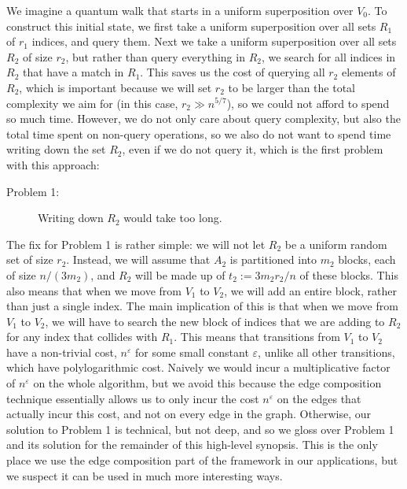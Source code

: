 \documentclass{article}
\renewcommand{\>}{\rangle}
\newcommand{\<}{\langle}
\renewcommand{\(}{\left(}
\renewcommand{\)}{\right)}
\newcommand{\eps}{\varepsilon}
\begin{document}
We imagine a quantum walk that starts in a uniform superposition over $V_0$. To construct this initial state, we first take a uniform superposition over all sets $R_1$ of $r_1$ indices, and query them. Next we take a uniform superposition over all sets $R_2$ of size $r_2$, but rather than query everything in $R_2$, we search for all indices in $R_2$ that have a match in $R_1$. This saves us the cost of querying all $r_2$ elements of $R_2$, which is important because we will set $r_2$ to be larger than the total complexity we aim for (in this case, $r_2 \gg n^{5/7}$), so we could not afford to spend so much time. However, we do not only care about query complexity, but also the total time spent on non-query operations, so we also do not want to spend time writing down the set $R_2$, even if we do not query it, which is the first problem with this approach:
\begin{description}
\item[Problem 1:] Writing down $R_2$ would take too long. 
\end{description}
The fix for Problem 1 is rather simple: we will not let $R_2$ be a uniform random set of size $r_2$. Instead, we will assume that $A_2$ is partitioned into $m_2$ blocks, each of size $n/(3m_2)$, and $R_2$ will be made up of $t_2:=3m_2r_2/n$ of these blocks. This also means that when we move from $V_1$ to $V_2$, we will add an entire block, rather than just a single index. The main implication of this is that when we move from $V_1$ to $V_2$, we will have to search the new block of indices that we are adding to $R_2$ for any index that collides with $R_1$. This means that transitions from $V_1$ to $V_2$ have a non-trivial cost, $n^{\eps}$ for some small constant $\eps$, unlike all other transitions, which have polylogarithmic cost. Naively we would incur a multiplicative factor of $n^\eps$ on the whole algorithm, but we avoid this because the edge composition technique essentially allows us to only incur the cost $n^{\eps}$ on the edges that actually incur this cost, and not on every edge in the graph. Otherwise, our solution to Problem 1 is technical, but not deep, and so we gloss over Problem 1 and its solution for the remainder of this high-level synopsis. This is the only place we use the edge composition part of the framework in our applications, but we suspect it can be used in much more interesting ways. 
\end{document}
